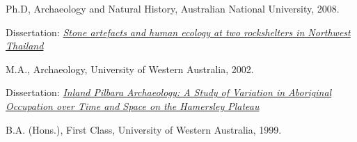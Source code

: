 
\ind Ph.D, Archaeology and Natural History, Australian National University, 2008.

 \vspace{0.05in}
\begin{Spacing}{0.75}
\ind \hspace{0.35in} 
\footnotesize {Dissertation: \emph{\href{http://dx.doi.org/10.6084/m9.figshare.765252}{Stone artefacts and human ecology at two rockshelters in Northwest Thailand}}} \normalsize \vspace{0.05in}
 \end{Spacing}

\ind M.A., Archaeology, University of Western Australia, 2002. 

\vspace{0.05in}
\begin{Spacing}{0.75} 
\ind \hspace{0.35in} \footnotesize Dissertation: \emph{\href{http://dx.doi.org/10.6084/m9.figshare.765251}{ Inland Pilbara Archaeology: A Study of Variation in Aboriginal Occupation over Time and Space on the Hamersley Plateau}} \normalsize \vspace{0.05in}
 \end{Spacing}

\ind B.A. (Hons.), First Class, University of Western Australia, 1999.